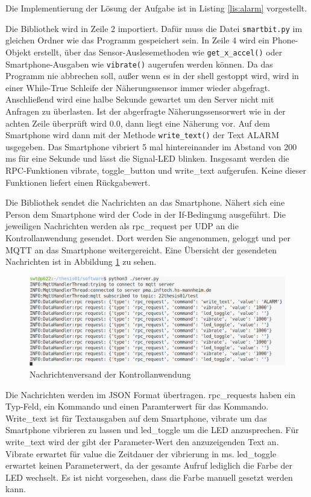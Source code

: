 \documentclass[11pt,a4paper]{report}
\begin{document}
Die Implementierung der Lösung der Aufgabe ist in Listing \ref{lis:alarm} vorgestellt.

\lstset{language=python, captionpos=b, frame=single, numberstyle=\tiny, style=customcs}

Die Bibliothek wird in Zeile 2 importiert.
Dafür muss die Datei \texttt{smartbit.py} im gleichen Ordner wie das Programm gespeichert sein.
In Zeile 4 wird ein Phone-Objekt erstellt, über das Sensor-Auslesemethoden wie \texttt{get\_x\_accel()} oder Smartphone-Ausgaben wie \texttt{vibrate()} augerufen werden können.
Da das Programm nie abbrechen soll, außer wenn es in der shell gestoppt wird, wird in einer While-True Schleife der Näherungssensor immer wieder abgefragt.
Anschließend wird eine halbe Sekunde gewartet um den Server nicht mit Anfragen zu überlasten.
Ist der abgerfragte Näherungssensorwert wie in der achten Zeile überprüft wird 0.0, dann liegt eine Näherung vor.
Auf dem Smartphone wird dann mit der  Methode \texttt{write\_text()} der Text ALARM usgegeben.
Das Smartphone vibriert 5 mal hintereinander im Abstand von 200 ms für eine Sekunde und lässt die Signal-LED blinken.
Insgesamt werden die RPC-Funktionen vibrate, toggle\_button und write\_text aufgerufen.
Keine dieser Funktionen liefert einen Rückgabewert.

Die Bibliothek sendet die Nachrichten an das Smartphone.
Nähert sich eine Person dem Smartphone wird der Code in der If-Bedingung ausgeführt.
Die jeweiligen Nachrichten werden als rpc\_request per UDP an die Kontrollanwendung gesendet.
Dort werden Sie angenommen, geloggt und per MQTT an das Smartphone weitergereicht.
Eine Übersicht der gesendeten Nachrichten ist in Abbildung \ref{fig:req_controll_app} zu sehen.
\begin{figure}[htbp]
  \centering
  \includegraphics[width=\textwidth]{images/server_requests}
  \caption{Nachrichtenversand der Kontrollanwendung}
  \label{fig:req_controll_app}
\end{figure}
Die Nachrichten werden im JSON Format übertragen.
rpc\_requests haben ein Typ-Feld, ein Kommando und einen Paramterwert für das Kommando.
Write\_text ist für Textausgaben auf dem Smartphone, vibrate um das Smartphone vibrieren zu lassen und led\_toggle um die LED anzusprechen.
Für write\_text wird der gibt der Parameter-Wert den anzuzeigenden Text an.
Vibrate erwartet für value die Zeitdauer der vibrierung in ms.
led\_toggle erwartet keinen Parameterwert, da der gesamte Aufruf lediglich die Farbe der LED wechselt.
Es ist nicht vorgesehen, dass die Farbe manuell gesetzt werden kann.
\end{document}
